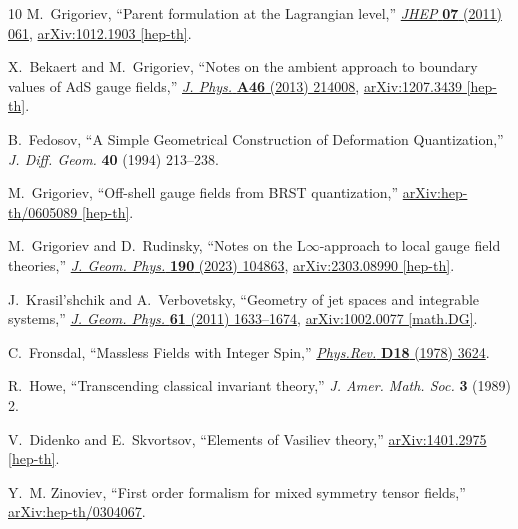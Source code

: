 \documentclass[a4paper,12pt]{article}
\numberwithin{equation}{section} %
\begin{document}
\begin{thebibliography}{10}
M.~Grigoriev, ``{P}arent formulation at the {L}agrangian level,'' \href{http://dx.doi.org/10.1007/JHEP07(2011)061}{{\em JHEP} {\bfseries 07} (2011) 061},
\href{http://arxiv.org/abs/1012.1903}{{\ttfamily arXiv:1012.1903 [hep-th]}}.

X.~Bekaert and M.~Grigoriev, ``{Notes on the ambient approach to boundary values of AdS gauge fields},'' \href{http://dx.doi.org/10.1088/1751-8113/46/21/214008}{{\em J. Phys.} {\bfseries A46} (2013) 214008},
\href{http://arxiv.org/abs/1207.3439}{{\ttfamily arXiv:1207.3439 [hep-th]}}.

B.~Fedosov, ``{A} {S}imple {G}eometrical {C}onstruction of {D}eformation {Q}uantization,'' {\em J. Diff. Geom.} {\bfseries 40} (1994) 213--238.

M.~Grigoriev, ``{O}ff-shell gauge fields from {BRST} quantization,''
\href{http://arxiv.org/abs/hep-th/0605089}{{\ttfamily arXiv:hep-th/0605089 [hep-th]}}.

M.~Grigoriev and D.~Rudinsky, ``{Notes on the L\ensuremath{\infty}-approach to local gauge field theories},'' \href{http://dx.doi.org/10.1016/j.geomphys.2023.104863}{{\em J. Geom. Phys.} {\bfseries 190} (2023) 104863}, \href{http://arxiv.org/abs/2303.08990}{{\ttfamily arXiv:2303.08990 [hep-th]}}.

J.~Krasil'shchik and A.~Verbovetsky, ``{G}eometry of jet spaces and integrable systems,'' \href{http://dx.doi.org/10.1016/j.geomphys.2010.10.012}{{\em J. Geom. Phys.} {\bfseries 61} (2011) 1633--1674},
\href{http://arxiv.org/abs/1002.0077}{{\ttfamily arXiv:1002.0077 [math.DG]}}.

C.~Fronsdal, ``{M}assless {F}ields with {I}nteger {S}pin,''
\href{http://dx.doi.org/10.1103/PhysRevD.18.3624}{{\em Phys.Rev.} {\bfseries D18} (1978) 3624}.

R.~Howe, ``{T}ranscending classical invariant theory,'' {\em J. Amer. Math. Soc.} {\bfseries 3} (1989) 2.

V.~Didenko and E.~Skvortsov, ``{E}lements of {V}asiliev theory,''
\href{http://arxiv.org/abs/1401.2975}{{\ttfamily arXiv:1401.2975 [hep-th]}}.

Y.~M. Zinoviev, ``{F}irst order formalism for mixed symmetry tensor fields,''
\href{http://arxiv.org/abs/hep-th/0304067}{{\ttfamily arXiv:hep-th/0304067}}.


\end{thebibliography}
\end{document}
